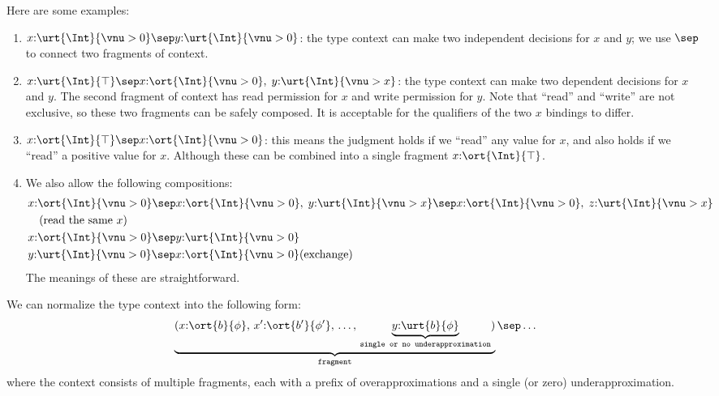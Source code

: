 Here are some examples:
\begin{enumerate}
    \item $x{:}\urt{\Int}{\vnu > 0} \sep y{:}\urt{\Int}{\vnu > 0}$: the type context can make two independent decisions for $x$ and $y$; we use $\sep$ to connect two fragments of context.
    \item $x{:}\urt{\Int}{\top} \sep x{:}\ort{\Int}{\vnu > 0},\; y{:}\urt{\Int}{\vnu > x}$: the type context can make two dependent decisions for $x$ and $y$. The second fragment of context has read permission for $x$ and write permission for $y$. Note that ``read'' and ``write'' are not exclusive, so these two fragments can be safely composed. It is acceptable for the qualifiers of the two $x$ bindings to differ.
    \item $x{:}\ort{\Int}{\top} \sep x{:}\ort{\Int}{\vnu > 0}$: this means the judgment holds if we ``read'' any value for $x$, and also holds if we ``read'' a positive value for $x$. Although these can be combined into a single fragment $x{:}\ort{\Int}{\top}$.
    \item We also allow the following compositions:
    \begin{align*}
        &x{:}\ort{\Int}{\vnu > 0} \sep x{:}\ort{\Int}{\vnu > 0},\; y{:}\urt{\Int}{\vnu > x} \sep x{:}\ort{\Int}{\vnu > 0},\; z{:}\urt{\Int}{\vnu > x} \\
        & \quad \text{(read the same $x$)}  \\
        &x{:}\ort{\Int}{\vnu > 0} \sep y{:}\urt{\Int}{\vnu > 0} \\ 
        &y{:}\urt{\Int}{\vnu > 0} \sep x{:}\ort{\Int}{\vnu > 0} \text{(exchange)}
    \end{align*}\noindent
    The meanings of these are straightforward.
\end{enumerate}

We can normalize the type context into the following form:
\begin{align*}
    \underbrace{(x{:}\ort{b}{\phi},\, x'{:}\ort{b'}{\phi'},\, \ldots,\, \underbrace{y{:}\urt{b}{\phi}}_{\texttt{single or no underapproximation}})}_{\texttt{fragment}} \sep \ldots
\end{align*}\noindent
where the context consists of multiple fragments, each with a prefix of overapproximations and a single (or zero) underapproximation.

